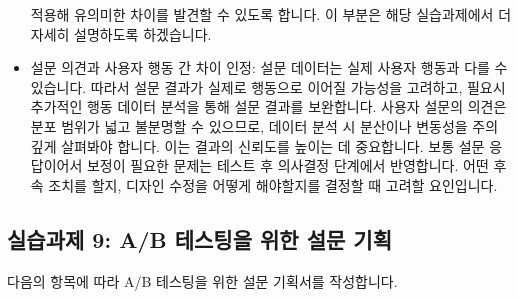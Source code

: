 \documentclass[
  letterpaper,
]{book}
\begin{document}
\begin{itemize}
  적용해 유의미한 차이를 발견할 수 있도록 합니다. 이 부분은 해당
  실습과제에서 더 자세히 설명하도록 하겠습니다.
\item
  설문 의견과 사용자 행동 간 차이 인정: 설문 데이터는 실제 사용자 행동과
  다를 수 있습니다. 따라서 설문 결과가 실제로 행동으로 이어질 가능성을
  고려하고, 필요시 추가적인 행동 데이터 분석을 통해 설문 결과를
  보완합니다. 사용자 설문의 의견은 분포 범위가 넓고 불분명할 수
  있으므로, 데이터 분석 시 분산이나 변동성을 주의 깊게 살펴봐야 합니다.
  이는 결과의 신뢰도를 높이는 데 중요합니다. 보통 설문 응답이어서 보정이
  필요한 문제는 테스트 후 의사결정 단계에서 반영합니다. 어떤 후속 조치를
  할지, 디자인 수정을 어떻게 해야할지를 결정할 때 고려할 요인입니다.
\end{itemize}

\subsection{실습과제 9: A/B 테스팅을 위한 설문
기획}\label{uxc2e4uxc2b5uxacfcuxc81c-9-ab-uxd14cuxc2a4uxd305uxc744-uxc704uxd55c-uxc124uxbb38-uxae30uxd68d}

다음의 항목에 따라 A/B 테스팅을 위한 설문 기획서를 작성합니다.
\end{document}
